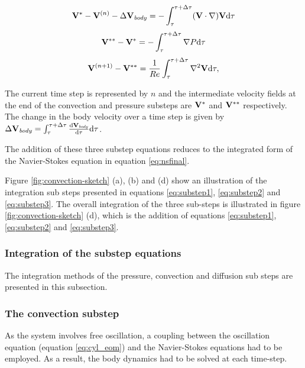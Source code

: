 \begin{equation} \centering
\label{eq:substep1}
\Vint - \Vn - \Delta\Vcyl = -\int_{\tau}^{\tau+\Delta\tau}(\vecV\cdot\nabla)\vecV \mathrm{d}\tau
\end{equation}
\begin{equation} \centering
\label{eq:substep2}
\Vintint - \Vint = -\int_{\tau}^{\tau+\Delta\tau}\nabla\Pres \mathrm{d}\tau
\end{equation}
\begin{equation} \centering
\label{eq:substep3}
\Vnext-\Vintint = \frac{1}{\reynoldsnumber}\int_{\tau}^{\tau+\Delta\tau}\gradsq{\vecV} \mathrm{d}\tau,
\end{equation} 
 
The current time step is represented by $n$ and the intermediate velocity fields at the end of the convection and pressure substeps are $\mathbf{V}^{*}$ and $\mathbf{V}^{**}$ respectively. The change in the body velocity over a time step is given by $\Delta\mathbf{V}_{\mathit{body}} =
\int_{\tau}^{\tau+\Delta\tau}\frac{\mathrm{d}\mathbf{V}_{\mathit{body}}}{\mathrm{d}\tau} \mathrm{d}\tau$. 

The addition of these three substep equations reduces to the integrated form of the Navier-Stokes equation in equation \ref{eq:nsfinal}. 



 Figure \ref{fig:convection-sketch} (a), (b) and (d) show an illustration of the integration sub steps presented in equations \ref{eq:substep1}, \ref{eq:substep2} and \ref{eq:substep3}. The overall integration of the three sub-steps is illustrated in figure \ref{fig:convection-sketch} (d), which is the addition of equations \ref{eq:substep1}, \ref{eq:substep2} and \ref{eq:substep3}. 
 
 

\subsubsection{Integration of the substep equations}
\label{subsec:sol}
 
 The integration methods of the pressure, convection and diffusion sub steps are presented in this subsection.
 
 \subsubsection{The convection substep}
 \label{subsub:convec}
 
As the system involves free oscillation, a coupling between the oscillation equation (equation \ref{eq:cyl_eom}) and the Navier-Stokes equations had to be employed. As a result, the body dynamics had to be solved at each time-step.

